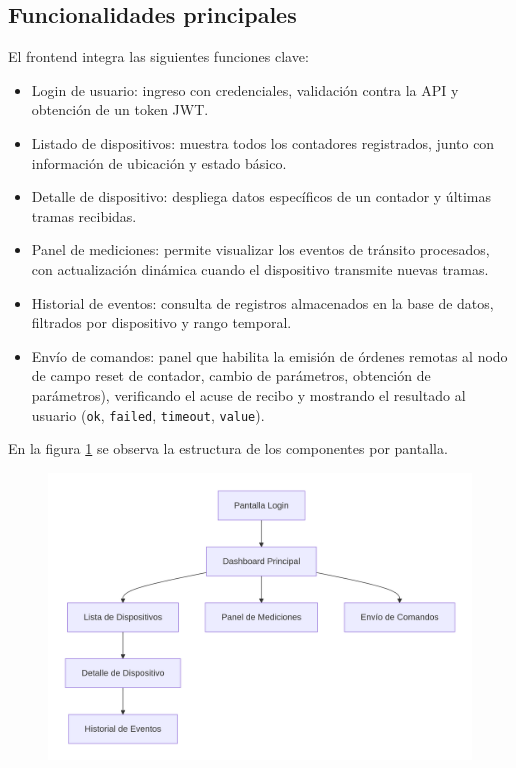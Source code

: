 \subsection{Funcionalidades principales}

El frontend integra las siguientes funciones clave:
\begin{itemize}
    \item Login de usuario: ingreso con credenciales, validación contra la API y obtención de un token JWT.
    \item Listado de dispositivos: muestra todos los contadores registrados, junto con información de ubicación y estado básico.
    \item Detalle de dispositivo: despliega datos específicos de un contador y últimas tramas recibidas.
    \item Panel de mediciones: permite visualizar los eventos de tránsito procesados, con actualización dinámica cuando el dispositivo transmite nuevas tramas.
    \item Historial de eventos: consulta de registros almacenados en la base de datos, filtrados por dispositivo y rango temporal.
    \item Envío de comandos: panel que habilita la emisión de órdenes remotas al nodo de campo  reset de contador, cambio de parámetros, obtención de parámetros), verificando el acuse de recibo y mostrando el resultado al usuario (\texttt{ok}, \texttt{failed}, \texttt{timeout}, \texttt{value}).
\end{itemize}

En la figura \ref{fig:diagrama_controladores} se observa la estructura de los componentes por pantalla.

\begin{figure}[htbp]
 
  \centering
  \includegraphics[width=1\linewidth]{./Figures/diagEstructuraComponentesPantallasFrontend.png}
  \label{fig:diagrama_controladores}
\end{figure}

